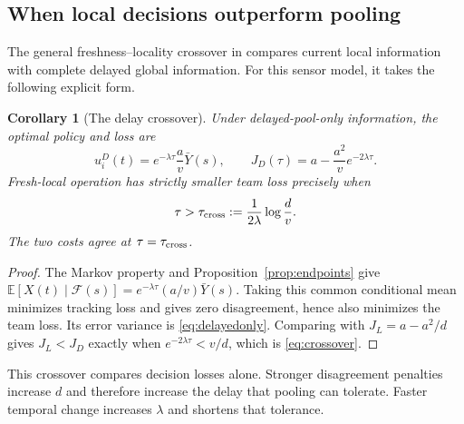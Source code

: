 \documentclass[letterpaper,10pt,conference]{ieeeconf}
\newtheorem{corollary}{Corollary}
\newcommand{\E}{\mathbb E}
\begin{document}
\subsection{When local decisions outperform pooling}
The general freshness--locality crossover in \cite{tina2026} compares current local information with complete delayed global information. For this sensor model, it takes the following explicit form.
\begin{corollary}[The delay crossover]\label{cor:crossover}
Under delayed-pool-only information, the optimal policy and loss are
\begin{equation}
 u_i^D(t)=e^{-\lambda\tau}\frac av\bar Y(s),\qquad
 J_D(\tau)=a-\frac{a^2}{v}e^{-2\lambda\tau}.\label{eq:delayedonly}
\end{equation}
Fresh-local operation has strictly smaller team loss precisely when
\begin{equation}
 \tau>\tau_{\rm cross}:=\frac{1}{2\lambda}\log\frac{d}{v}.\label{eq:crossover}
\end{equation}
The two costs agree at $\tau=\tau_{\rm cross}$.
\end{corollary}
\begin{proof}
The Markov property and Proposition~\ref{prop:endpoints} give
$\E[X(t)\mid\mathcal F(s)]=e^{-\lambda\tau}(a/v)\bar Y(s)$. Taking this common conditional mean minimizes tracking loss and gives zero disagreement, hence also minimizes the team loss. Its error variance is \eqref{eq:delayedonly}. Comparing with $J_L=a-a^2/d$ gives $J_L<J_D$ exactly when $e^{-2\lambda\tau}<v/d$, which is \eqref{eq:crossover}.
\end{proof}
This crossover compares decision losses alone. Stronger disagreement penalties increase $d$ and therefore increase the delay that pooling can tolerate. Faster temporal change increases $\lambda$ and shortens that tolerance.
\end{document}
